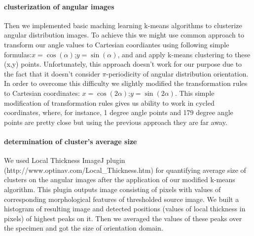 \paragraph{clusterization of angular images}
Then we implemented basic maching learning k-means algorithms to clusterize angular distribution images.
To achieve this we might use common approach to transform our angle values to Cartesian coordiantes using following simple formulas:$x=\cos(\alpha)$;$y=\sin(\alpha)$, and and apply k-means clustering to these (x,y) points.
Unfortunately, this approach doesn't work for our purpose due to the fact that it doesn't consider $\pi$-periodicity of angular distribution orientation.
In order to overcome this difficulty we slightly modified the transformation rules to Cartesian coordinates: $x=\cos(2\alpha)$;$y=\sin(2\alpha)$.
This simple modification of transformation rules  gives us ability to work in cycled coordinates, where, for instance, 1 degree angle points and 179 degree angle points are pretty close but using the previous approach they are far away.     
\paragraph{determination of cluster's average size}
We used Local Thickness ImageJ plugin (http://www.optinav.com/Local\_Thickness.htm) for quantifying average size of clusters on the angular images after the application of our modified k-means algorithm.
This plugin outputs image consisting of pixels with values of corresponding morphological features of thresholded source image.
We built a  histogram of resulting image and detected positions (values of local thickness in pixels) of highest peaks on it.
Then we averaged the values of these peaks over the specimen and got the size of orientation domain.  